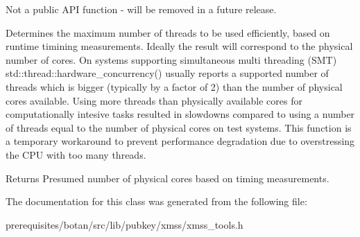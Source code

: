 Not a public A\+PI function -\/ will be removed in a future release.

Determines the maximum number of threads to be used efficiently, based on runtime timining measurements. Ideally the result will correspond to the physical number of cores. On systems supporting simultaneous multi threading (S\+MT) std\+::thread\+::hardware\+\_\+concurrency() usually reports a supported number of threads which is bigger (typically by a factor of 2) than the number of physical cores available. Using more threads than physically available cores for computationally intesive tasks resulted in slowdowns compared to using a number of threads equal to the number of physical cores on test systems. This function is a temporary workaround to prevent performance degradation due to overstressing the C\+PU with too many threads.

\begin{DoxyReturn}{Returns}
Presumed number of physical cores based on timing measurements. 
\end{DoxyReturn}


The documentation for this class was generated from the following file\+:\begin{DoxyCompactItemize}
\item 
prerequisites/botan/src/lib/pubkey/xmss/xmss\+\_\+tools.\+h\end{DoxyCompactItemize}
